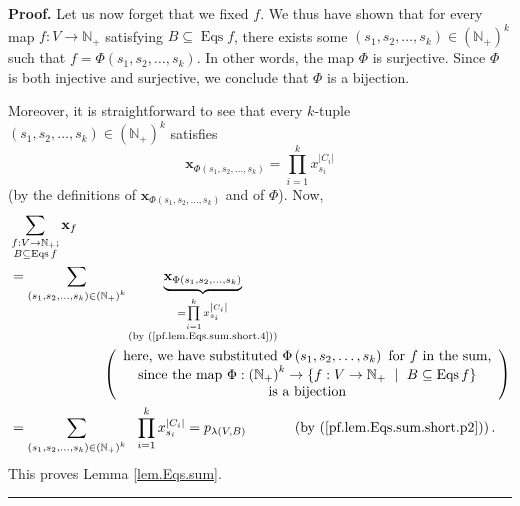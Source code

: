 \documentclass[numbers=enddot,12pt,final,onecolumn,notitlepage]{scrartcl}%
\theoremstyle{definition}
\newenvironment{proof}[1][Proof]{\noindent\textbf{#1.} }{\ \rule{0.5em}{0.5em}}
\newenvironment{vershort}{}{}
\let\sumnonlimits\sum
\let\prodnonlimits\prod
\renewcommand{\sum}{\sumnonlimits\limits}
\renewcommand{\prod}{\prodnonlimits\limits}
\begin{document}
\begin{vershort}
\begin{proof}
Let us now forget that we fixed $f$. We thus have shown that for every map
$f:V\rightarrow\mathbb{N}_{+}$ satisfying $B\subseteq\operatorname*{Eqs}f$,
there exists some $\left(  s_{1},s_{2},\ldots,s_{k}\right)  \in\left(
\mathbb{N}_{+}\right)  ^{k}$ such that $f=\Phi\left(  s_{1},s_{2},\ldots
,s_{k}\right)  $. In other words, the map $\Phi$ is surjective. Since $\Phi$
is both injective and surjective, we conclude that $\Phi$ is a bijection.

Moreover, it is straightforward to see that every $k$-tuple $\left(
s_{1},s_{2},\ldots,s_{k}\right)  \in\left(  \mathbb{N}_{+}\right)  ^{k}$
satisfies%
\begin{equation}
\mathbf{x}_{\Phi\left(  s_{1},s_{2},\ldots,s_{k}\right)  }=\prod_{i=1}%
^{k}x_{s_{i}}^{\left\vert C_{i}\right\vert } \label{pf.lem.Eqs.sum.short.4}%
\end{equation}
(by the definitions of $\mathbf{x}_{\Phi\left(  s_{1},s_{2},\ldots
,s_{k}\right)  }$ and of $\Phi$). Now,%
\begin{align*}
&  \sum_{\substack{f:V\rightarrow\mathbb{N}_{+};\\B\subseteq
\operatorname*{Eqs}f}}\mathbf{x}_{f}\\
&  =\sum_{\left(  s_{1},s_{2},\ldots,s_{k}\right)  \in\left(  \mathbb{N}%
_{+}\right)  ^{k}}\underbrace{\mathbf{x}_{\Phi\left(  s_{1},s_{2},\ldots
,s_{k}\right)  }}_{\substack{=\prod_{i=1}^{k}x_{s_{i}}^{\left\vert
C_{i}\right\vert }\\\text{(by (\ref{pf.lem.Eqs.sum.short.4}))}}}\\
&  \ \ \ \ \ \ \ \ \ \ \ \ \ \ \ \ \ \ \ \ \left(
\begin{array}
[c]{c}%
\text{here, we have substituted }\Phi\left(  s_{1},s_{2},\ldots,s_{k}\right)
\text{ for }f\text{ in the sum,}\\
\text{since the map }\Phi:\left(  \mathbb{N}_{+}\right)  ^{k}\rightarrow
\left\{  f:V\rightarrow\mathbb{N}_{+}\ \mid\ B\subseteq\operatorname*{Eqs}%
f\right\} \\
\text{is a bijection}%
\end{array}
\right) \\
&  =\sum_{\left(  s_{1},s_{2},\ldots,s_{k}\right)  \in\left(  \mathbb{N}%
_{+}\right)  ^{k}}\ \ \prod_{i=1}^{k}x_{s_{i}}^{\left\vert C_{i}\right\vert
}=p_{\lambda\left(  V,B\right)  }\ \ \ \ \ \ \ \ \ \ \left(  \text{by
(\ref{pf.lem.Eqs.sum.short.p2})}\right)  .
\end{align*}
This proves Lemma \ref{lem.Eqs.sum}.
\end{proof}
\end{vershort}
\end{document}
